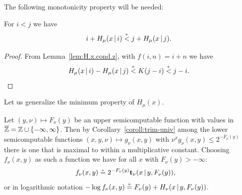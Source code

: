 The following monotonicity property will be needed:

\begin{lemma}\label{lem:mon}
 For $i < j$ we have
 \[
   i + H_\mu(x\,\vert\, i) \stackrel{{}_+}{<} j + H_\mu(x\,\vert\, j) .
 \]
\end{lemma}
\begin{proof}
  From Lemma~\ref{lem:H.x.cond.z}, with $f(i, n)=i + n$ we have
 \[
   H_{\mu}(x \,\vert\, i) - H_{\mu}(x \,\vert\, j) \stackrel{{}_+}{<} K(j-i) \stackrel{{}_+}{<} j-i.
 \]
\end{proof}

Let us generalize the minimum property of $H_{\mu}(x)$.

 \begin{proposition}\label{propo:univ-test-gener}
Let $(y,\nu)\mapsto F_{\nu}(y)$ be an upper semicomputable
function with values in $\overline{\mathbb{Z}}=\mathbb{Z}\cup\{-\infty,\infty\}$.
Then by Corollary~\ref{coroll:trim-univ} among the lower semicomputable functions
$(x,y,\nu) \mapsto g_{\nu}(x,y)$ with $\nu^{x}g_{\nu}(x,y)\le 2^{-F_{\nu}(y)}$
there is one that is maximal to within a multiplicative constant.
Choosing $f_{\nu}(x,y)$ as such a function we have
for all $x$ with $F_{\nu}(y) > -\infty$:
 \begin{align*}
  f_{\nu}(x,y) &\stackrel{{}_*}{=} 2^{-F_{\nu}(y)}\mathbf{t}_{\nu}(x \,\vert\, y, F_{\nu}(y)),
 \end{align*}
or in logarithmic notation 
$-\log f_{\nu}(x,y) \stackrel{{}_+}{=} F_{\nu}(y)+H_{\nu}(x \,\vert\, y, F_{\nu}(y))$.
 \end{proposition}

